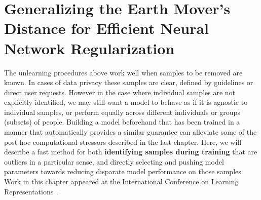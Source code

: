 \chapter{Generalizing the Earth Mover's Distance for Efficient Neural Network Regularization}\label{chap:demd}
The unlearning procedures above work well
when samples to be removed are known.
In cases of data privacy these samples are clear,
defined by guidelines or direct user requests.
However in the case where individual
samples are not explicitly identified,
we may still want a model to behave as if
it is agnostic to individual samples,
or perform equally across different individuals
or groups (subsets) of people. Building a model
beforehand that has been trained in a manner
that automatically provides a similar guarantee
can alleviate some of the post-hoc
computational stressors described in the last chapter.
Here, we will describe a fast method
for both \textbf{identifying samples during training}
that are outliers in a particular sense,
and directly selecting and pushing model parameters
towards reducing disparate model performance
on those samples.
Work in this chapter appeared at the International
Conference on Learning Representations~\citep{demd}.






